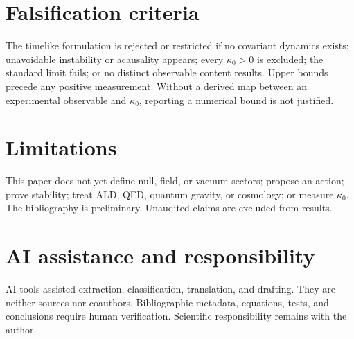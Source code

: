 \documentclass[11pt,a4paper]{article}
\begin{document}
\section{Falsification criteria}\label{sec:falsification}
The timelike formulation is rejected or restricted if no covariant dynamics exists; unavoidable instability or acausality appears; every $\kappa_0>0$ is excluded; the standard limit fails; or no distinct observable content results. Upper bounds precede any positive measurement. Without a derived map between an experimental observable and $\kappa_0$, reporting a numerical bound is not justified.

\section{Limitations}\label{sec:limitations}
This paper does not yet define null, field, or vacuum sectors; propose an action; prove stability; treat ALD, QED, quantum gravity, or cosmology; or measure $\kappa_0$. The bibliography is preliminary. Unaudited claims are excluded from results.

\section{AI assistance and responsibility}\label{sec:ai}
AI tools assisted extraction, classification, translation, and drafting. They are neither sources nor coauthors. Bibliographic metadata, equations, tests, and conclusions require human verification. Scientific responsibility remains with the author.



\end{document}
